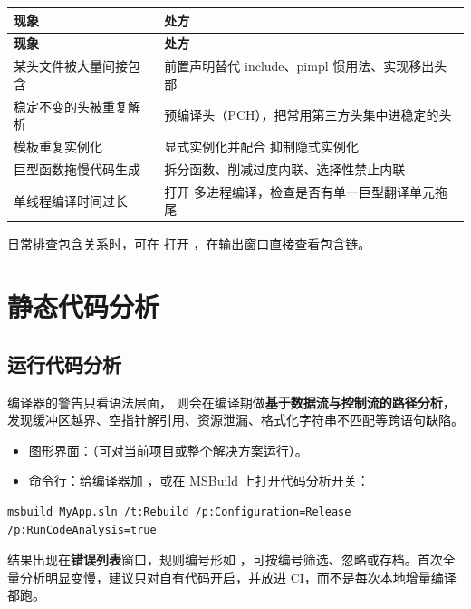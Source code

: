 \begin{longtable}{L{5.4cm}L{9.6cm}}
\toprule \textbf{现象} & \textbf{处方} \\ \midrule
\endfirsthead
\toprule \textbf{现象} & \textbf{处方} \\ \midrule
\endhead
\bottomrule \endlastfoot
某头文件被大量间接包含 & 前置声明替代 include、pimpl 惯用法、实现移出头部 \\
稳定不变的头被重复解析 & 预编译头（PCH），把常用第三方头集中进稳定的头 \\
模板重复实例化 & 显式实例化并配合  抑制隐式实例化 \\
巨型函数拖慢代码生成 & 拆分函数、削减过度内联、选择性禁止内联 \\
单线程编译时间过长 & 打开  多进程编译，检查是否有单一巨型翻译单元拖尾 \\
\end{longtable}

日常排查包含关系时，可在  打开 ，在输出窗口直接查看包含链。

\section{静态代码分析}
\subsection{运行代码分析}
编译器的警告只看语法层面， 则会在编译期做\textbf{基于数据流与控制流的路径分析}，发现缓冲区越界、空指针解引用、资源泄漏、格式化字符串不匹配等跨语句缺陷。

\begin{itemize}
  \item 图形界面：（可对当前项目或整个解决方案运行）。
  \item 命令行：给编译器加 ，或在 MSBuild 上打开代码分析开关：
\end{itemize}

\begin{lstlisting}[style=shellstyle]
msbuild MyApp.sln /t:Rebuild /p:Configuration=Release /p:RunCodeAnalysis=true
\end{lstlisting}

结果出现在\textbf{错误列表}窗口，规则编号形如 ，可按编号筛选、忽略或存档。首次全量分析明显变慢，建议只对自有代码开启，并放进 CI，而不是每次本地增量编译都跑。

